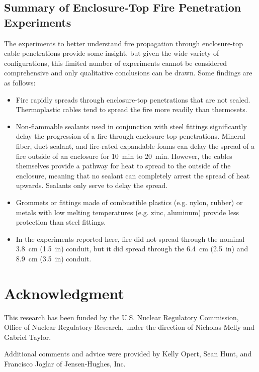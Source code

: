 \clearpage

\subsection{Summary of Enclosure-Top Fire Penetration Experiments}

The experiments to better understand fire propagation through enclosure-top cable penetrations provide some insight, but given the wide variety of configurations, this limited number of experiments cannot be considered comprehensive and only qualitative conclusions can be drawn. Some findings are as follows:
\begin{itemize}
\item Fire rapidly spreads through enclosure-top penetrations that are not sealed. Thermoplastic cables tend to spread the fire more readily than thermosets.
\item Non-flammable sealants used in conjunction with steel fittings significantly delay the progression of a fire through enclosure-top penetrations. Mineral fiber, duct sealant, and fire-rated expandable foams can delay the spread of a fire outside of an enclosure for 10~min to 20~min. However, the cables themselves provide a pathway for heat to spread to the outside of the enclosure, meaning that no sealant can completely arrest the spread of heat upwards. Sealants only serve to delay the spread.
\item Grommets or fittings made of combustible plastics (e.g. nylon, rubber) or metals with low melting temperatures (e.g. zinc, aluminum) provide less protection than steel fittings.
\item In the experiments reported here, fire did not spread through the nominal 3.8~cm (1.5~in) conduit, but it did spread through the 6.4~cm (2.5~in) and 8.9~cm (3.5~in) conduit.
\end{itemize}


\newpage

\section{Acknowledgment}

This research has been funded by the U.S. Nuclear Regulatory Commission, Office of Nuclear Regulatory Research, under the direction of Nicholas Melly and Gabriel Taylor.

Additional comments and advice were provided by Kelly Opert, Sean Hunt, and Francisco Joglar of Jensen-Hughes, Inc.


